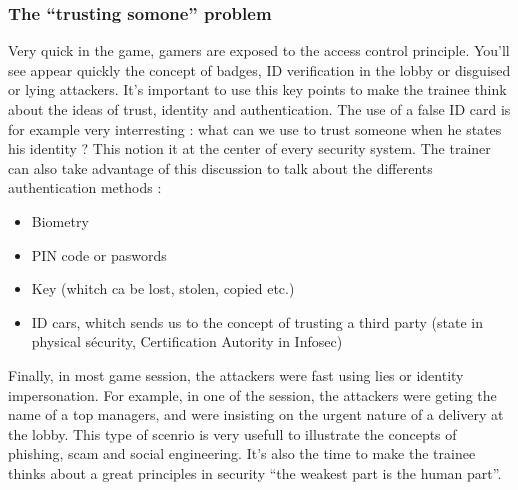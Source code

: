 \documentclass[11pt]{article} %
\begin{document}
\subsubsection{The ``trusting somone'' problem}
Very quick in the game, gamers are exposed to the access control principle. 
You'll see appear quickly the concept of badges, ID verification in the lobby or 
disguised or lying attackers. It's important to use this key points to make the 
trainee think about the ideas of trust, identity and authentication. The use 
of a false ID card is for example very interresting : what can we use to trust 
someone when he states his identity ? This notion it at the center of every 
security system. The trainer can also take advantage of this discussion to talk 
about the differents authentication methods : 
\begin{itemize}
\item Biometry
\item PIN code or paswords
\item Key (whitch ca be lost, stolen, copied etc.)
\item ID cars, whitch sends us to the concept of trusting a third party 
(state in physical sécurity, Certification Autority in Infosec)
\end{itemize}

Finally, in most game session, the attackers were fast using lies or identity impersonation.
For example, in one of the session, the attackers were geting the name of a top managers, 
and were insisting on the urgent nature of a delivery at the lobby. This type of scenrio 
is very usefull to illustrate the concepts of phishing, scam and social engineering. 
It's also the time to make the trainee thinks about a great principles in security 
``the weakest part is the human part''. 
\end{document}
